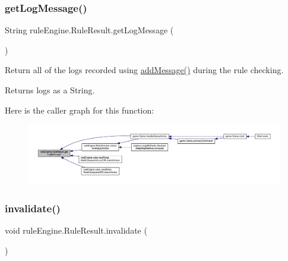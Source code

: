 \subsubsection{\texorpdfstring{get\+Log\+Message()}{getLogMessage()}}
{\footnotesize\ttfamily String rule\+Engine.\+Rule\+Result.\+get\+Log\+Message (\begin{DoxyParamCaption}{ }\end{DoxyParamCaption})\hspace{0.3cm}{\ttfamily [inline]}}

Return all of the logs recorded using \mbox{\hyperlink{classrule_engine_1_1_rule_result_a530d8dd9cb3461dba440b37e12347f5a}{add\+Message()}} during the rule checking.

\begin{DoxyReturn}{Returns}
logs as a String. 
\end{DoxyReturn}
Here is the caller graph for this function\+:
\nopagebreak
\begin{figure}[H]
\begin{center}
\leavevmode
\includegraphics[width=350pt]{classrule_engine_1_1_rule_result_a25680c11a9156d9052b04a1803f81e9f_icgraph}
\end{center}
\end{figure}
\mbox{\label{classrule_engine_1_1_rule_result_a3257a949d317dfb83ecc2b9cb17ab5fd}} 
\subsubsection{\texorpdfstring{invalidate()}{invalidate()}}
{\footnotesize\ttfamily void rule\+Engine.\+Rule\+Result.\+invalidate (\begin{DoxyParamCaption}{ }\end{DoxyParamCaption})\hspace{0.3cm}{\ttfamily [inline]}}

